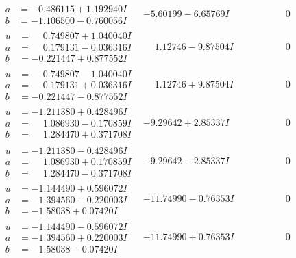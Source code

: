 \documentclass[1p]{elsarticle_modified}
\theoremstyle{definition}
\begin{document}
$$\begin{array}{c|c|c}
\begin{aligned}
a &= -0.486115 + 1.192940 I \\
b &= -1.106500 - 0.760056 I\end{aligned}
 & -5.60199 - 6.65769 I & \phantom{-0.000000 } 0 \\ \hline\begin{aligned}
u &= \phantom{-}0.749807 + 1.040040 I \\
a &= \phantom{-}0.179131 - 0.036316 I \\
b &= -0.221447 + 0.877552 I\end{aligned}
 & \phantom{-}1.12746 - 9.87504 I & \phantom{-0.000000 } 0 \\ \hline\begin{aligned}
u &= \phantom{-}0.749807 - 1.040040 I \\
a &= \phantom{-}0.179131 + 0.036316 I \\
b &= -0.221447 - 0.877552 I\end{aligned}
 & \phantom{-}1.12746 + 9.87504 I & \phantom{-0.000000 } 0 \\ \hline\begin{aligned}
u &= -1.211380 + 0.428496 I \\
a &= \phantom{-}1.086930 - 0.170859 I \\
b &= \phantom{-}1.284470 + 0.371708 I\end{aligned}
 & -9.29642 + 2.85337 I & \phantom{-0.000000 } 0 \\ \hline\begin{aligned}
u &= -1.211380 - 0.428496 I \\
a &= \phantom{-}1.086930 + 0.170859 I \\
b &= \phantom{-}1.284470 - 0.371708 I\end{aligned}
 & -9.29642 - 2.85337 I & \phantom{-0.000000 } 0 \\ \hline\begin{aligned}
u &= -1.144490 + 0.596072 I \\
a &= -1.394560 - 0.220003 I \\
b &= -1.58038 + 0.07420 I\end{aligned}
 & -11.74990 - 0.76353 I & \phantom{-0.000000 } 0 \\ \hline\begin{aligned}
u &= -1.144490 - 0.596072 I \\
a &= -1.394560 + 0.220003 I \\
b &= -1.58038 - 0.07420 I\end{aligned}
 & -11.74990 + 0.76353 I & \phantom{-0.000000 } 0 \\ \hline\begin{aligned}

\end{aligned}
\end{array}$$
\end{document}
